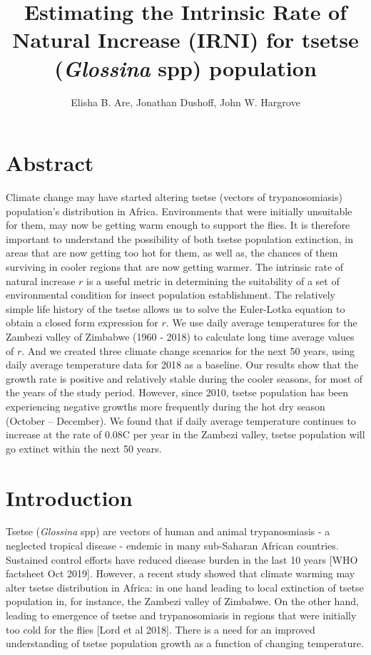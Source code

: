 \documentclass[10pt,a4paper]{article}
\author{Elisha B. Are, Jonathan Dushoff, John W. Hargrove}
\title{Estimating the Intrinsic Rate of Natural Increase (IRNI) for tsetse ({\it Glossina} spp) population}
\begin{document}
\maketitle

\section*{Abstract} 
Climate change may have started altering tsetse (vectors of trypanosomiasis) population’s distribution in Africa. Environments that were initially unsuitable for them, may now be getting warm enough to support the flies.  It is therefore important to understand the possibility of both tsetse population extinction, in areas that are now getting too hot for them, as well as, the chances of them surviving in cooler regions that are now getting warmer. The intrinsic rate of natural increase $r$ is a useful metric in determining the suitability of a set of environmental condition for insect population establishment.  The relatively simple life history of the tsetse allows us to solve the Euler-Lotka equation to obtain a closed form expression for $r$. We use daily average temperatures for the Zambezi valley of Zimbabwe (1960 - 2018) to calculate long time average values of $r$. And we created three climate change scenarios for the next 50 years, using daily average temperature data for 2018 as a baseline. Our results show that the growth rate is positive and relatively stable during the cooler seasons, for most of the years of the study period. However, since 2010, tsetse population has been experiencing negative growths more frequently during the hot dry season (October – December).  We found that if daily average temperature continues to increase at the rate of 0.08\degree C per year in the Zambezi valley, tsetse population will go extinct within the next 50 years.   



\section*{Introduction} 

Tsetse ({\it Glossina} spp) are vectors of human and animal trypanosmiasis - a neglected tropical disease - endemic in many sub-Saharan African countries. Sustained control efforts have reduced disease burden in the last 10 years [WHO factsheet Oct 2019].  However, a recent study showed that climate warming may alter tsetse distribution in Africa: in one hand leading to local extinction of tsetse population in, for instance, the Zambezi valley of Zimbabwe. On the other hand, leading to emergence of tsetse and trypanosomiasis in regions that were initially too cold for the flies [Lord et al 2018]. There is a need for an improved understanding of tsetse population growth as a function of changing temperature.\\ 
\end{document}
